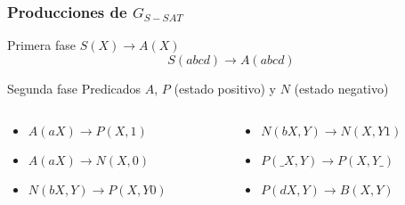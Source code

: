 \documentclass{beamer}
\begin{document}
\begin{frame}
    \frametitle{Producciones de $G_{S-SAT}$}
    
    \begin{block}{Primera fase}
        $S(X)\to A(X)$
        \pause
        $$S(abcd)\to A(abcd)$$
    \end{block}
    
    \pause
    \begin{block}{Segunda fase}
        Predicados $A$, $P$ (estado positivo) y $N$ (estado negativo)
        \begin{columns}
            \begin{column}{0.45\textwidth}
                \begin{itemize}
                    \item $A(aX)\to P(X,1)$
                          \pause
                    \item $A(aX)\to N(X,0)$
                          \pause
                    \item $N(bX,Y)\to P(X,Y0)$
                \end{itemize}
            \end{column}
            \pause
            \begin{column}{0.45\textwidth}
                \begin{itemize}
                    \item $N(bX,Y)\to N(X,Y1)$
                          \pause
                    \item $P(\_X,Y)\to P(X,Y\_)$
                          \pause
                    \item $P(dX,Y)\to B(X,Y)$
                \end{itemize}
            \end{column}
        \end{columns}
        
    \end{block}
\end{frame}
\end{document}
